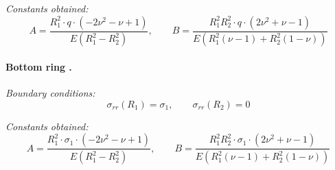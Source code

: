 \documentclass[12pt]{article}
\begin{document}
\textit{Constants obtained:}
\[
A = \frac{R_1^2 \cdot q \cdot (-2\nu^2 - \nu + 1)}{E (R_1^2 - R_2^2)}, \qquad
B = \frac{R_1^2 R_2^2 \cdot q \cdot (2\nu^2 + \nu - 1)}{E (R_1^2 (\nu - 1) + R_2^2 (1 - \nu))}
\]

\vspace{1em}

\paragraph{Bottom ring .}

\textit{Boundary conditions:}
\[
\sigma_{rr}(R_1) = \sigma_1, \qquad \sigma_{rr}(R_2) = 0
\]

\textit{Constants obtained:}
\[
A = \frac{R_1^2 \cdot \sigma_1 \cdot (-2\nu^2 - \nu + 1)}{E (R_1^2 - R_2^2)}, \qquad
B = \frac{R_1^2 R_2^2 \cdot \sigma_1 \cdot (2\nu^2 + \nu - 1)}{E (R_1^2 (\nu - 1) + R_2^2 (1 - \nu))}
\]


\newpage

\end{document}
